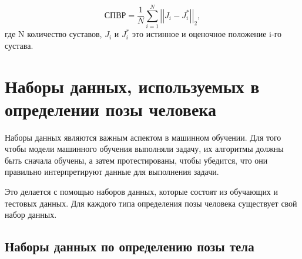 \begin{enumerate}[label=\arabic*)]
	\begin{equation}
		\text{СПВР} = \frac{1}{N}\sum_{i=1}^{N} \left| \left| J_i -J_i^*\right| \right|_2,
	\end{equation}
	где N количество суставов, $J_i$ и $J_i^*$ это истинное и оценочное положение i-го сустава.
\end{enumerate}

\section{Наборы данных, используемых в определении позы человека}

Наборы данных являются важным аспектом в машинном обучении. Для того чтобы модели машинного обучения выполняли задачу, их алгоритмы должны быть сначала обучены, а затем протестированы, чтобы убедится, что они правильно интерпретируют данные для выполнения задачи.

Это делается с помощью наборов данных, которые состоят из обучающих и тестовых данных. 
Для каждого типа определения позы человека существует свой набор данных.

\subsection{Наборы данных по определению позы тела}


